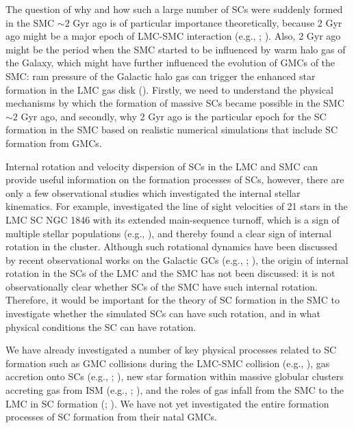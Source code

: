 \documentclass[fleqn,usenatbib]{mnras}
\begin{document}
The question of why and how such a large number of SCs were suddenly formed in the SMC ${\sim}2$ Gyr ago is of particular importance theoretically, because 2 Gyr ago might be a major epoch of LMC-SMC interaction (e.g., \citealt{K15_Gardiner_Noguchi1996}; \citealt{69Yoshizawa_Noguchi2003}). Also, 2 Gyr ago might be the period when the SMC started to be influenced by warm halo gas of the Galaxy, which might have further influenced the evolution of GMCs of the SMC: ram pressure of the Galactic halo gas can trigger the enhanced star formation in the LMC gas disk (\citealt{K16_Mastropietro_Burkert_Moore2009}). Firstly, we need to understand the physical mechanisms by which the formation of massive SCs became possible in the SMC ${\sim}2$ Gyr ago, and secondly, why 2 Gyr ago is the particular epoch for the SC formation in the SMC based on realistic numerical simulations that include SC formation from GMCs.


Internal rotation and velocity dispersion of SCs in the LMC and SMC can provide useful information on the formation processes of SCs, however, there are only a few observational studies which investigated the internal stellar kinematics. For example, \cite{K18_Mackey_et_al2013} investigated the line of sight velocities of 21 stars in the LMC SC NGC 1846 with its extended main-sequence turnoff, which is a sign of multiple stellar populations (e.g., \citealt{K19_Keller_Mackey_Da_Costa2011}), and thereby found a clear sign of internal rotation in the cluster. Although such rotational dynamics have been discussed by recent observational works on the Galactic GCs (e.g., \citealt{K20_Bianchini_et_al2018}; \citealt{K21_Barth_et_al2020}), the origin of internal rotation in the SCs of the LMC and the SMC has not been discussed: it is not observationally clear whether SCs of the SMC have such internal rotation. Therefore, it would be important for the theory of SC formation in the SMC to investigate whether the simulated SCs can have such rotation, and in what physical conditions the SC can have rotation.


We have already investigated a number of key physical processes related
to SC formation such as GMC collisions during the LMC-SMC collision
(e.g., \citealt{79Bekki_et_al2004}), gas accretion onto SCs (e.g., \citealt{K32_Bekki_Mackey2009}; \citealt{K33_Armstrong_et_al2018}), new star formation within massive globular clusters accreting gas from ISM  (e.g., \citealt{K34_McKenzie_Bekki2018}; \citealt{K23_McKenzie_Bekki2021}), and the roles of gas infall from the SMC to the LMC in SC formation (\citealt{K35_Bekki_Chiba2007}; \citealt{K36_Tsuge_et_al2019}). We have not yet investigated the entire formation processes of SC formation from their natal GMCs. 
\end{document}
